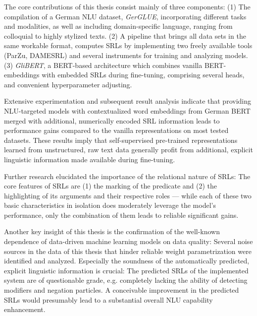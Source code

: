\label{chap:6_conclusion}



The core contributions of this thesis consist mainly of three components: (1)
The compilation of a German NLU dataset, \emph{GerGLUE}, incorporating different
tasks and modalities, as well as including domain-specific language, ranging from
colloquial to highly stylized texts. (2) A pipeline that brings all data sets in
the same workable format, computes SRLs by implementing two freely available tools
(ParZu, DAMESRL) and several instruments for training and analyzing models. (3)
\emph{GliBERT}, a BERT-based architecture which combines vanilla BERT-embeddings
with embedded SRLs during fine-tuning, comprising several heads, and convenient
hyperparameter adjusting.

Extensive experimentation and subsequent result analysis indicate that providing NLU-targeted
models with contextualized word embeddings from German BERT merged with additional, numerically
encoded SRL information leads to performance gains compared to the vanilla representations on most
tested datasets. These results imply that self-supervised pre-trained representations learned from
unstructured, raw text data generally profit from additional, explicit linguistic information made
available during fine-tuning.

Further research elucidated the importance of the relational nature of SRLs: The core
features of SRLs are (1) the marking of the predicate and (2) the highlighting of its
arguments and their respective roles --- while each of these two basic characteristics
in isolation does moderately leverage the model's performance, only the combination of
them leads to reliable significant gains.

Another key insight of this thesis is the confirmation of the well-known dependence of data-driven
machine learning models on data quality: Several noise sources in the data of this thesis that
hinder reliable weight parametrization were identified and analyzed. Especially the soundness of
the automatically predicted, explicit linguistic information is crucial: The predicted SRLs of the
implemented system are of questionable grade, e.g. completely lacking the ability of detecting
modifiers and negation particles. A conceivable improvement in the predicted SRLs would presumably
lead to a substantial overall NLU capability enhancement.



